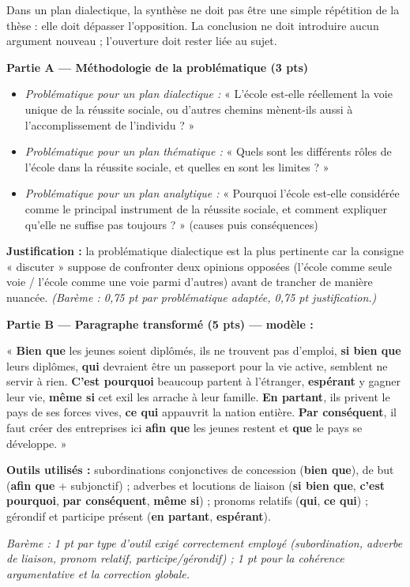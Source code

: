 \documentclass[11pt]{article}
\begin{document}
\begin{attention}
Dans un plan dialectique, la synthèse ne doit pas être une simple répétition de la thèse : elle doit dépasser l'opposition. La conclusion ne doit introduire aucun argument nouveau ; l'ouverture doit rester liée au sujet.
\end{attention}

\begin{corrige}
\textbf{Partie A — Méthodologie de la problématique (3 pts)}
\begin{itemize}
\item \emph{Problématique pour un plan dialectique :} « L'école est-elle réellement la voie unique de la réussite sociale, ou d'autres chemins mènent-ils aussi à l'accomplissement de l'individu ? »
\item \emph{Problématique pour un plan thématique :} « Quels sont les différents rôles de l'école dans la réussite sociale, et quelles en sont les limites ? »
\item \emph{Problématique pour un plan analytique :} « Pourquoi l'école est-elle considérée comme le principal instrument de la réussite sociale, et comment expliquer qu'elle ne suffise pas toujours ? » (causes puis conséquences)
\end{itemize}
\textbf{Justification :} la problématique dialectique est la plus pertinente car la consigne « discuter » suppose de confronter deux opinions opposées (l'école comme seule voie / l'école comme une voie parmi d'autres) avant de trancher de manière nuancée. \emph{(Barème : 0,75 pt par problématique adaptée, 0,75 pt justification.)}

\textbf{Partie B — Paragraphe transformé (5 pts) — modèle :}

« \textbf{Bien que} les jeunes soient diplômés, ils ne trouvent pas d'emploi, \textbf{si bien que} leurs diplômes, \textbf{qui} devraient être un passeport pour la vie active, semblent ne servir à rien. \textbf{C'est pourquoi} beaucoup partent à l'étranger, \textbf{espérant} y gagner leur vie, \textbf{même si} cet exil les arrache à leur famille. \textbf{En partant}, ils privent le pays de ses forces vives, \textbf{ce qui} appauvrit la nation entière. \textbf{Par conséquent}, il faut créer des entreprises ici \textbf{afin que} les jeunes restent et \textbf{que} le pays se développe. »

\textbf{Outils utilisés :} subordinations conjonctives de concession (\textbf{bien que}), de but (\textbf{afin que} + subjonctif) ; adverbes et locutions de liaison (\textbf{si bien que}, \textbf{c'est pourquoi}, \textbf{par conséquent}, \textbf{même si}) ; pronoms relatifs (\textbf{qui}, \textbf{ce qui}) ; gérondif et participe présent (\textbf{en partant}, \textbf{espérant}).

\emph{Barème : 1 pt par type d'outil exigé correctement employé (subordination, adverbe de liaison, pronom relatif, participe/gérondif) ; 1 pt pour la cohérence argumentative et la correction globale.}
\end{corrige}
\end{document}
